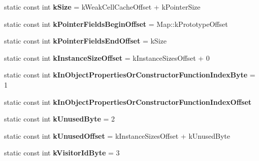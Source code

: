\begin{DoxyCompactItemize}
\item 
static const int {\bfseries k\+Size} = k\+Weak\+Cell\+Cache\+Offset + k\+Pointer\+Size\hypertarget{classv8_1_1internal_1_1_map_aa4e29ae9c6ce51359888cf4a769a1585}{}\label{classv8_1_1internal_1_1_map_aa4e29ae9c6ce51359888cf4a769a1585}

\item 
static const int {\bfseries k\+Pointer\+Fields\+Begin\+Offset} = Map\+::k\+Prototype\+Offset\hypertarget{classv8_1_1internal_1_1_map_a31a62da6ae3835ea76e1f48a735f5e18}{}\label{classv8_1_1internal_1_1_map_a31a62da6ae3835ea76e1f48a735f5e18}

\item 
static const int {\bfseries k\+Pointer\+Fields\+End\+Offset} = k\+Size\hypertarget{classv8_1_1internal_1_1_map_a03f76d6b32e01a0217d97d7a17d29781}{}\label{classv8_1_1internal_1_1_map_a03f76d6b32e01a0217d97d7a17d29781}

\item 
static const int {\bfseries k\+Instance\+Size\+Offset} = k\+Instance\+Sizes\+Offset + 0\hypertarget{classv8_1_1internal_1_1_map_a90565a6d11c9416b1768a6e51849614e}{}\label{classv8_1_1internal_1_1_map_a90565a6d11c9416b1768a6e51849614e}

\item 
static const int {\bfseries k\+In\+Object\+Properties\+Or\+Constructor\+Function\+Index\+Byte} = 1\hypertarget{classv8_1_1internal_1_1_map_a6eb535f0a9187e3c1e10efe1f6148ed3}{}\label{classv8_1_1internal_1_1_map_a6eb535f0a9187e3c1e10efe1f6148ed3}

\item 
static const int {\bfseries k\+In\+Object\+Properties\+Or\+Constructor\+Function\+Index\+Offset}
\item 
static const int {\bfseries k\+Unused\+Byte} = 2\hypertarget{classv8_1_1internal_1_1_map_ac9683ceba7a25b8b9f181763810d5c55}{}\label{classv8_1_1internal_1_1_map_ac9683ceba7a25b8b9f181763810d5c55}

\item 
static const int {\bfseries k\+Unused\+Offset} = k\+Instance\+Sizes\+Offset + k\+Unused\+Byte\hypertarget{classv8_1_1internal_1_1_map_a962db7ee6c5bd955a5e5c522e53ca6b7}{}\label{classv8_1_1internal_1_1_map_a962db7ee6c5bd955a5e5c522e53ca6b7}

\item 
static const int {\bfseries k\+Visitor\+Id\+Byte} = 3\hypertarget{classv8_1_1internal_1_1_map_a6dc85d25a73a94ab6660530695bac8ae}{}\label{classv8_1_1internal_1_1_map_a6dc85d25a73a94ab6660530695bac8ae}


\end{DoxyCompactItemize}
